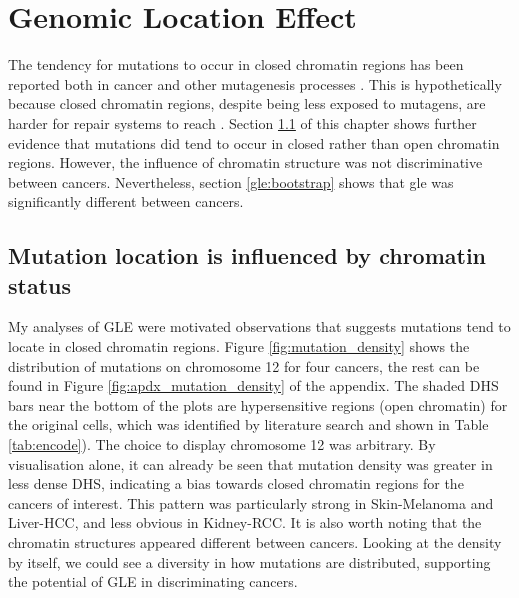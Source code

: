 \chapter{Genomic Location Effect}\label{gle}

The tendency for mutations to occur in closed \gls{chromatin} regions has been reported both in cancer and other mutagenesis processes \citep{Polak2015,Prendergast2007ChromatinGenome}. This is hypothetically because closed chromatin regions, despite being less exposed to mutagens, are harder for repair systems to reach \citep{Prendergast2007ChromatinGenome,Teng1997ExcisionSequences, Morse2002PhotoreactivationCerevisiae}. Section \ref{gle:chromatin} of this chapter shows further evidence that mutations did tend to occur in closed rather than open chromatin regions. However, the influence of chromatin structure was not discriminative between cancers. Nevertheless, section \ref{gle:bootstrap} shows that \gls{gle} was significantly different between cancers. 

\section{Mutation location is influenced by chromatin status}\label{gle:chromatin}
My analyses of GLE were motivated observations that suggests mutations tend to locate in closed chromatin regions. Figure \ref{fig:mutation_density} shows the distribution of mutations on chromosome 12 for four cancers, the rest can be found in Figure \ref{fig:apdx_mutation_density} of the appendix. The shaded DHS bars near the bottom of the plots are hypersensitive regions (open chromatin) for the original cells, which was identified by literature search and shown in Table \ref{tab:encode}). The choice to display chromosome 12 was arbitrary. By visualisation alone, it can already be seen that mutation density was greater in less dense DHS, indicating a bias towards closed chromatin regions for the cancers of interest. This pattern was particularly strong in Skin-Melanoma and Liver-HCC, and less obvious in Kidney-RCC. It is also worth noting that the chromatin structures appeared different between cancers. Looking at the density by itself, we could see a diversity in how mutations are distributed, supporting the potential of GLE in discriminating cancers. 



